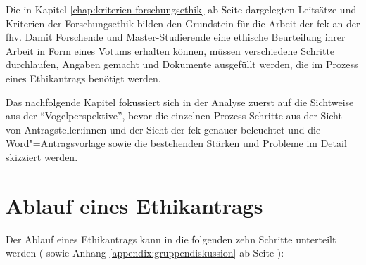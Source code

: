 \documentclass[a4paper,12pt,twoside,numbers=noendperiod]{scrreprt}
\begin{document}
Die in Kapitel \ref{chap:kriterien-forschungsethik} ab Seite \pageref{chap:kriterien-forschungsethik} dargelegten Leitsätze und Kriterien der Forschungsethik bilden den Grundstein für die Arbeit der \acl{fek} an der \acl{fhv}. Damit Forschende und Master-Studierende eine ethische Beurteilung ihrer Arbeit in Form eines Votums erhalten können, müssen verschiedene Schritte durchlaufen, Angaben gemacht und Dokumente ausgefüllt werden, die im Prozess eines Ethikantrags benötigt werden.

\medskip

Das nachfolgende Kapitel fokussiert sich in der Analyse zuerst auf die Sichtweise aus der \enquote{Vogelperspektive}, bevor die einzelnen Prozess-Schritte aus der Sicht von Antragsteller:innen und der Sicht der \ac{fek} genauer beleuchtet und die Word"=Antragsvorlage sowie die bestehenden Stärken und Probleme im Detail skizziert werden.

\section{Ablauf eines Ethikantrags}
\label{sec:ablauf-ethikantrag}

Der Ablauf eines Ethikantrags kann in die folgenden zehn Schritte unterteilt werden (\cite{fachhochschule_vorarlberg_gmbh_forschungsethik-kommission_2021, forschungsethik-kommission_der_fachhochschule_vorarlberg_verfahrensordnung_2020} sowie Anhang \ref{appendix:gruppendiskussion} ab Seite \pageref{appendix:gruppendiskussion}):
\end{document}
